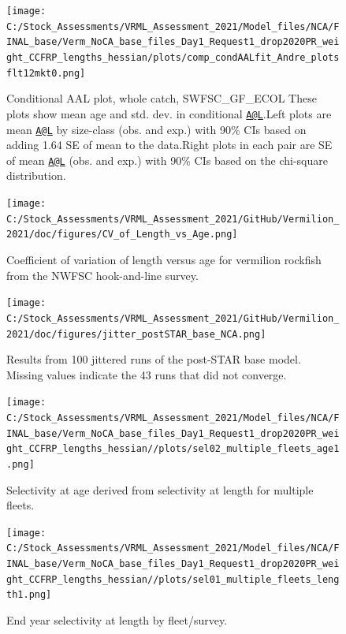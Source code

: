 \documentclass[
  english,
  a4paper,
]{article}
\begin{document}
\begin{figure}
\centering
\texttt{[image: C:/Stock\_Assessments/VRML\_Assessment\_2021/Model\_files/NCA/FINAL\_base/Verm\_NoCA\_base\_files\_Day1\_Request1\_drop2020PR\_weight\_CCFRP\_lengths\_hessian/plots/comp\_condAALfit\_Andre\_plotsflt12mkt0.png]}
\caption{Conditional AAL plot, whole catch, SWFSC\_GF\_ECOL
These plots show mean age and std. dev. in conditional \href{mailto:A@L}{\nolinkurl{A@L}}.Left plots are mean \href{mailto:A@L}{\nolinkurl{A@L}} by size-class (obs. and exp.) with 90\% CIs based on adding 1.64 SE of mean to the data.Right plots in each pair are SE of mean \href{mailto:A@L}{\nolinkurl{A@L}} (obs. and exp.) with 90\% CIs based on the chi-square distribution.\label{fig:comp_condAALfit_Andre_plotsflt12mkt0}}
\end{figure}

\FloatBarrier

\FloatBarrier

\begin{figure}
\centering
\texttt{[image: C:/Stock\_Assessments/VRML\_Assessment\_2021/GitHub/Vermilion\_2021/doc/figures/CV\_of\_Length\_vs\_Age.png]}
\caption{Coefficient of variation of length versus age for vermilion rockfish from the NWFSC hook-and-line survey.\label{fig:cv-length-age}}
\end{figure}

\begin{figure}
\centering
\texttt{[image: C:/Stock\_Assessments/VRML\_Assessment\_2021/GitHub/Vermilion\_2021/doc/figures/jitter\_postSTAR\_base\_NCA.png]}
\caption{Results from 100 jittered runs of the post-STAR base model. Missing values indicate the 43 runs that did not converge.\label{fig:jitter}}
\end{figure}

\clearpage
\FloatBarrier

\FloatBarrier

\begin{figure}
\centering
\texttt{[image: C:/Stock\_Assessments/VRML\_Assessment\_2021/Model\_files/NCA/FINAL\_base/Verm\_NoCA\_base\_files\_Day1\_Request1\_drop2020PR\_weight\_CCFRP\_lengths\_hessian//plots/sel02\_multiple\_fleets\_age1.png]}
\caption{Selectivity at age derived from selectivity at length for multiple fleets.\label{fig:selex-age-all}}
\end{figure}

\FloatBarrier

\begin{figure}
\centering
\texttt{[image: C:/Stock\_Assessments/VRML\_Assessment\_2021/Model\_files/NCA/FINAL\_base/Verm\_NoCA\_base\_files\_Day1\_Request1\_drop2020PR\_weight\_CCFRP\_lengths\_hessian//plots/sel01\_multiple\_fleets\_length1.png]}
\caption{End year selectivity at length by fleet/survey.\label{fig:selex-length-all}}
\end{figure}
\end{document}
